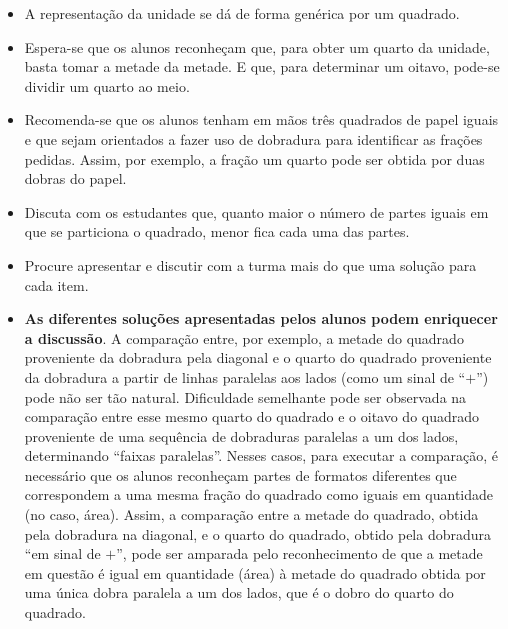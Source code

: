 \begin{atividade}
\begin{itemize} %
    \item       A representação da unidade se dá de forma genérica por um quadrado.
    \item       Espera-se que os alunos reconheçam que, para obter um quarto da unidade, basta tomar a metade da metade. E que, para determinar um oitavo, pode-se dividir um quarto ao meio.
    \item       Recomenda-se que os alunos tenham em mãos três quadrados de papel iguais e que sejam orientados a fazer uso de dobradura para identificar as frações pedidas. Assim, por exemplo, a fração um quarto pode ser obtida por duas dobras do papel.
    \item Discuta com os estudantes que, quanto maior o número de partes iguais em que se particiona o quadrado, menor fica cada uma das partes.
    \item Procure apresentar e discutir com a turma mais do que uma solução para cada item.
    \item \textbf{As diferentes soluções apresentadas pelos alunos podem enriquecer a discussão}. A comparação entre, por exemplo, a metade do quadrado proveniente da dobradura pela diagonal e o quarto do quadrado proveniente da dobradura a partir de linhas paralelas aos lados (como um sinal de ``$+$'') pode não ser tão natural. Dificuldade semelhante pode ser observada na comparação entre esse mesmo quarto do quadrado e o oitavo do quadrado proveniente de uma sequência de dobraduras paralelas a um dos lados, determinando ``faixas paralelas''. Nesses casos, para executar a comparação, é necessário que os alunos reconheçam partes de formatos diferentes que correspondem a uma mesma fração do quadrado como iguais em quantidade (no caso, área). Assim, a comparação entre a metade do quadrado, obtida pela dobradura na diagonal, e o quarto do quadrado, obtido pela dobradura ``em sinal de $+$'', pode ser amparada pelo reconhecimento de que a metade em questão é igual em quantidade (área) à metade do quadrado obtida por uma única dobra paralela a um dos lados, que é o dobro do quarto do quadrado.

\begin{center}
  \quad\quad
\end{center}


\end{itemize}
\end{atividade}
